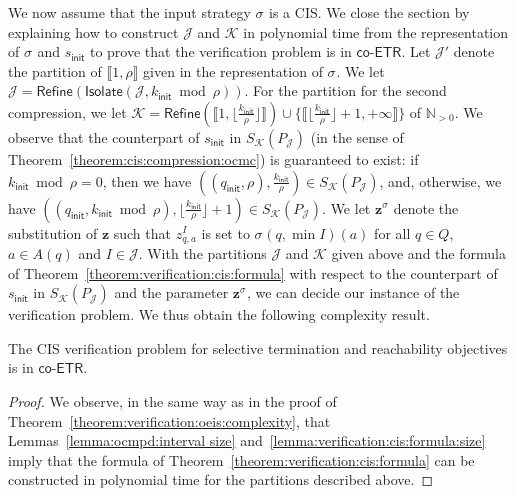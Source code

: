 \documentclass[a4paper,UKenglish,cleveref,autoref,thm-restate,colorlinks]{lipics-v2021}
\newcommand{\init}{\mathsf{init}}
\newcommand{\integerInterval}[1]{\llbracket{}#1\rrbracket{}}
\newcommand{\coetr}{\textsf{co-ETR}}
\newcommand{\IN}{\mathbb{N}}
\newcommand{\INpos}{\IN_{>0}}
\newcommand{\mdpStateSpace}{S}
\newcommand{\ocStateSpace}{Q}
\newcommand{\ocState}{q}
\newcommand{\ocCount}{k}
\newcommand{\ocConfig}{s}
\newcommand{\ocActionSpace}{A}
\newcommand{\ocAction}{a}
\newcommand{\period}{\rho}
\newcommand{\intPartB}{\mathcal{J}}
\newcommand{\intPartC}{\mathcal{K}}
\newcommand{\interval}{I}
\newcommand{\cisChainStateSpace}{P_{\intPartB}}
\newcommand{\compressCisStateSpace}{\mdpStateSpace_{\intPartC}({\cisChainStateSpace})}
\newcommand{\varStrat}{z}
\newcommand{\varStratTuple}{\mathbf{\varStrat}}
\newcommand{\vectStratTuple}{\varStratTuple^\strat}
\newcommand{\stratGeneric}[1]{{\sigma_{#1}}}
\newcommand{\strat}{\stratGeneric{}}
\begin{document}
We now assume that the input strategy $\strat$ is a CIS.
We close the section by explaining how to construct $\intPartB$ and $\intPartC$ in polynomial time from the representation of $\strat$ and $\ocConfig_\init$ to prove that the verification problem is in $\coetr$.
Let $\intPartB'$ denote the partition of $\integerInterval{1, \period}$ given in the representation of $\strat$.
We let $\intPartB=\mathsf{Refine}(\mathsf{Isolate}(\intPartB, \ocCount_\init\bmod\period))$.
For the partition for the second compression, we let $\intPartC=\mathsf{Refine}(\integerInterval{1, \lfloor\frac{\ocCount_\init}{\period}\rfloor})\cup\{\integerInterval{\lfloor{\frac{\ocCount_\init}{\period}\rfloor+1, +\infty}}\}$ of $\INpos$.
We observe that the counterpart of $\ocConfig_\init$ in $\compressCisStateSpace$ (in the sense of Theorem~\ref{theorem:cis:compression:ocmc}) is guaranteed to exist: if $\ocCount_\init\bmod\period=0$, then we have $((\ocState_\init, \period), \frac{\ocCount_\init}{\period})\in\compressCisStateSpace$, and, otherwise, we have $((\ocState_\init, \ocCount_\init\bmod\period), \lfloor\frac{\ocCount_\init}{\period}\rfloor+1)\in\compressCisStateSpace$.
We let $\vectStratTuple$ denote the substitution of $\varStratTuple$ such that $\varStrat^\interval_{\ocState, \ocAction}$ is set to $\strat(\ocState, \min\interval)(\ocAction)$ for all $\ocState\in\ocStateSpace$, $\ocAction\in\ocActionSpace(\ocState)$ and $\interval\in\intPartB$.
With the partitions $\intPartB$ and $\intPartC$ given above and the formula of Theorem~\ref{theorem:verification:cis:formula} with respect to the counterpart of $\ocConfig_\init$ in $\compressCisStateSpace$ and the parameter $\vectStratTuple$, we can decide our instance of the verification problem.
We thus obtain the following complexity result.
\begin{theorem}\label{theorem:verification:cis:complexity}
  The CIS verification problem for selective termination and reachability objectives is in $\coetr$.
\end{theorem}
\begin{proof}
  We observe, in the same way as in the proof of Theorem~\ref{theorem:verification:oeis:complexity}, that Lemmas~\ref{lemma:ocmpd:interval size} and~\ref{lemma:verification:cis:formula:size} imply that the formula of Theorem~\ref{theorem:verification:cis:formula} can be constructed in polynomial time for the partitions described above.
\end{proof}
\end{document}
